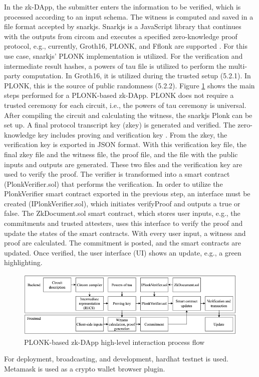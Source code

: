 In the zk-DApp, the submitter enters the information to be verified, which is processed according to an input schema. The witness is computed and saved in a file format accepted by snarkjs. Snarkjs is a JavaScript library that continues with the outputs from circom and executes a specified zero-knowledge proof protocol, e.g., currently, Groth16, PLONK, and Fflonk are supported \citep{snarkjsdoc}. For this use case, snarkjs' PLONK implementation is utilized. For the verification and intermediate result hashes, a powers of tau file is utilized to perform the multi-party computation. In Groth16, it is utilized during the trusted setup (5.2.1). In PLONK, this is the source of public randomness (5.2.2). Figure \ref{fig:zk-DAppgeneral} shows the main steps performed for a PLONK-based zk-DApp. PLONK does not require a trusted ceremony for each circuit, i.e., the powers of tau ceremony is universal. After compiling the circuit and calculating the witness, the snarkjs Plonk can be set up. A final protocol transcript key (zkey) is generated and verified. The zero-knowledge key includes proving and verification key \citep{snarkjsdoc}. From the zkey, the verification key is exported in JSON format. With this verification key file, the final zkey file and the witness file, the proof file, and the file with the public inputs and outputs are generated. These two files and the verification key are used to verify the proof. The verifier is transformed into a smart contract (PlonkVerifier.sol) that performs the verification. In order to utilize the PlonkVerifier smart contract exported in the previous step, an interface must be created (IPlonkVerifier.sol), which initiates verifyProof and outputs a true or false. The ZkDocument.sol smart contract, which stores user inputs, e.g., the commitments and trusted attesters, uses this interface to verify the proof and update the states of the smart contracts. With every user input, a witness and proof are calculated. The commitment is posted, and the smart contracts are updated. Once verified, the user interface (UI) shows an update, e.g., a green highlighting. 
\begin{figure}[hbt]
	\centering
		\includegraphics[width=1.0\textwidth]{Pictures/circom snarkjs process flow.png}
	\caption{PLONK-based zk-DApp high-level interaction process flow}
	\label{fig:zk-DAppgeneral}
\end{figure}
For deployment, broadcasting, and development, hardhat testnet is used. Metamask is used as a crypto wallet browser plugin.

